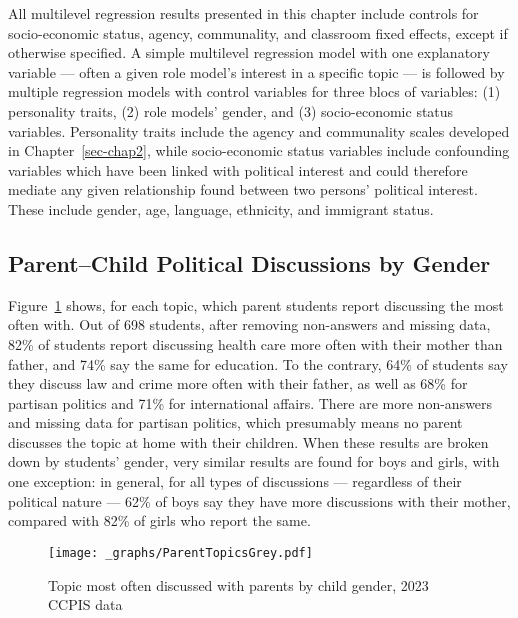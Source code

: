 \documentclass[
  letterpaper,
  DIV=11,
  numbers=noendperiod]{scrreprt}
\begin{document}
All multilevel regression results presented in this chapter include
controls for socio-economic status, agency, communality, and classroom
fixed effects, except if otherwise specified. A simple multilevel
regression model with one explanatory variable --- often a given role
model's interest in a specific topic --- is followed by multiple
regression models with control variables for three blocs of variables:
(1) personality traits, (2) role models' gender, and (3) socio-economic
status variables. Personality traits include the agency and communality
scales developed in Chapter~\ref{sec-chap2}, while socio-economic status
variables include confounding variables which have been linked with
political interest and could therefore mediate any given relationship
found between two persons' political interest. These include gender,
age, language, ethnicity, and immigrant status.

\hypertarget{parentchild-political-discussions-by-gender}{%
\subsection{Parent--Child Political Discussions by
Gender}\label{parentchild-political-discussions-by-gender}}

Figure~\ref{fig-parents} shows, for each topic, which parent students
report discussing the most often with. Out of 698 students, after
removing non-answers and missing data, 82\% of students report
discussing health care more often with their mother than father, and
74\% say the same for education. To the contrary, 64\% of students say
they discuss law and crime more often with their father, as well as 68\%
for partisan politics and 71\% for international affairs. There are more
non-answers and missing data for partisan politics, which presumably
means no parent discusses the topic at home with their children. When
these results are broken down by students' gender, very similar results
are found for boys and girls, with one exception: in general, for all
types of discussions --- regardless of their political nature --- 62\%
of boys say they have more discussions with their mother, compared with
82\% of girls who report the same.

\begin{figure}

{\centering \texttt{[image: \_graphs/ParentTopicsGrey.pdf]}

}

\caption{\label{fig-parents}Topic most often discussed with parents by
child gender, 2023 CCPIS data}

\end{figure}
\end{document}
